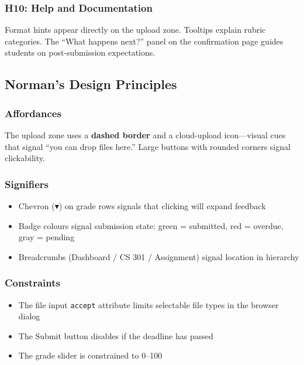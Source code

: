 \documentclass[12pt, a4paper]{article}
\begin{document}
\subsubsection{H10: Help and Documentation}

Format hints appear directly on the upload zone. Tooltips explain rubric categories. The ``What happens next?'' panel on the confirmation page guides students on post-submission expectations.

\subsection{Norman's Design Principles}

\subsubsection{Affordances}
The upload zone uses a \textbf{dashed border} and a cloud-upload icon—visual cues that signal ``you can drop files here.'' Large buttons with rounded corners signal clickability.

\subsubsection{Signifiers}
\begin{itemize}[noitemsep]
  \item Chevron ($\blacktriangledown$) on grade rows signals that clicking will expand feedback
  \item Badge colours signal submission state: green = submitted, red = overdue, gray = pending
  \item Breadcrumbs (Dashboard / CS 301 / Assignment) signal location in hierarchy
\end{itemize}

\subsubsection{Constraints}
\begin{itemize}[noitemsep]
  \item The file input \texttt{accept} attribute limits selectable file types in the browser dialog
  \item The Submit button disables if the deadline has passed
  \item The grade slider is constrained to 0–100
\end{itemize}
\end{document}
